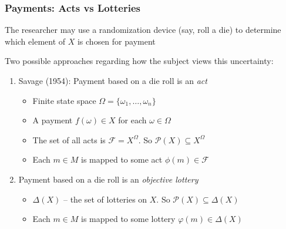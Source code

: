 \begin{frame}
  \frametitle{Payments: Acts vs Lotteries}

The researcher may use a randomization device (say, roll a die) to determine which element of $X$ is chosen for payment

\bigskip

Two possible approaches regarding how the subject views this uncertainty:

\begin{enumerate}
\item Savage (1954): Payment based on a die roll is an \emph{act}\\
  \begin{itemize}
    \item Finite state space $\Omega=\{\omega_1,\ldots,\omega_n\}$
    \item A payment $f(\omega)\in X$ for each $\omega\in \Omega$
    \item The set of all acts is $\mathcal{F}=X^\Omega$. So $\mathcal{P}(X)\subseteq X^\Omega$
    \item Each $m\in M$ is mapped to some act $\phi(m)\in \mathcal{F}$
  \end{itemize}

\bigskip

\item Payment based on a die roll is an \emph{objective lottery}\\
  \begin{itemize}
    \item $\Delta(X)$ -- the set of lotteries on $X$. So $\mathcal{P}(X)\subseteq \Delta(X)$
    \item Each $m\in M$ is mapped to some lottery $\varphi(m)\in \Delta(X)$
  \end{itemize}


\end{enumerate}



\end{frame}

